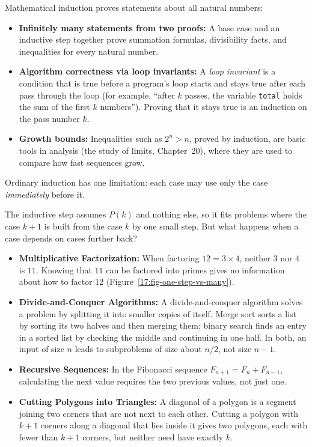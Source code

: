Mathematical induction proves statements about all natural numbers:
\begin{itemize}
\item \textbf{Infinitely many statements from two proofs:} A base case and an inductive step together prove summation formulas, divisibility facts, and inequalities for every natural number.
\item \textbf{Algorithm correctness via loop invariants:} A \emph{loop invariant} is a condition that is true before a program's loop starts and stays true after each pass through the loop (for example, ``after $k$ passes, the variable \texttt{total} holds the sum of the first $k$ numbers''). Proving that it stays true is an induction on the pass number $k$.
\item \textbf{Growth bounds:} Inequalities such as $2^n > n$, proved by induction, are basic tools in analysis (the study of limits, Chapter~20), where they are used to compare how fast sequences grow.
\end{itemize}

Ordinary induction has one limitation: each case may use only the case \emph{immediately} before it.

The inductive step assumes $P(k)$ and nothing else, so it fits problems where the case $k+1$ is built from the case $k$ by one small step. But what happens when a case depends on cases further back?
\begin{itemize}
\item \textbf{Multiplicative Factorization:} When factoring $12 = 3 \times 4$, neither $3$ nor $4$ is $11$. Knowing that $11$ can be factored into primes gives no information about how to factor $12$ (Figure~\ref{17:fig-one-step-vs-many}).
\item \textbf{Divide-and-Conquer Algorithms:} A divide-and-conquer algorithm solves a problem by splitting it into smaller copies of itself. Merge sort sorts a list by sorting its two halves and then merging them; binary search finds an entry in a sorted list by checking the middle and continuing in one half. In both, an input of size $n$ leads to subproblems of size about $n/2$, not size $n-1$.
\item \textbf{Recursive Sequences:} In the Fibonacci sequence $F_{n+1} = F_n + F_{n-1}$, calculating the next value requires the two previous values, not just one.
\item \textbf{Cutting Polygons into Triangles:} A diagonal of a polygon is a segment joining two corners that are not next to each other. Cutting a polygon with $k+1$ corners along a diagonal that lies inside it gives two polygons, each with fewer than $k+1$ corners, but neither need have exactly $k$.
\end{itemize}

